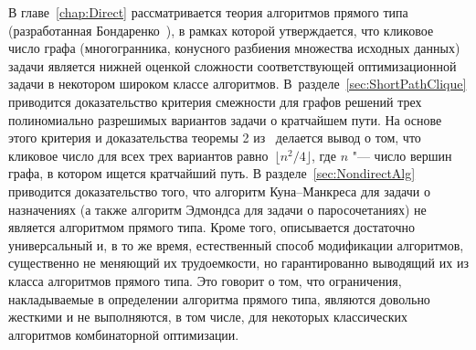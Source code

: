 В главе~\ref{chap:Direct} рассматривается теория алгоритмов прямого типа (разработанная Бондаренко~\cite{BondBook:1995}), в рамках которой утверждается, что кликовое число графа (многогранника, конусного разбиения множества исходных данных) задачи является нижней оценкой сложности соответствующей оптимизационной задачи в некотором широком классе алгоритмов. %
В~разделе~\ref{sec:ShortPathClique} приводится доказательство критерия смежности для графов решений трех полиномиально разрешимых вариантов задачи о кратчайшем пути.
На основе этого критерия и доказательства теоремы 2 из~\cite{Bondarenko:1993SW3A} делается вывод о том, что кликовое число для всех трех вариантов равно~$\lfloor n^2 / 4\rfloor$, где $n$ "--- число вершин графа, в котором ищется кратчайший путь.
В разделе~\ref{sec:NondirectAlg} приводится доказательство того, что алгоритм Куна--Манкреса для задачи о назначениях (а также алгоритм Эдмондса для задачи о паросочетаниях) не является алгоритмом прямого типа.
Кроме того, описывается достаточно универсальный и, в то же время, естественный способ модификации алгоритмов, существенно не меняющий их трудоемкости, но гарантированно выводящий их из класса алгоритмов прямого типа.
Это говорит о том, что ограничения, накладываемые в определении алгоритма прямого типа, являются довольно жесткими и не выполняются, в том числе, для некоторых классических алгоритмов комбинаторной оптимизации.


